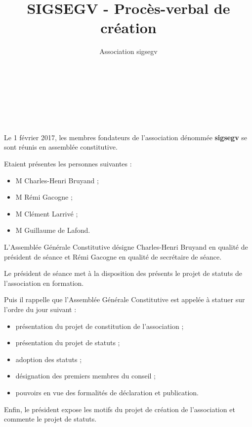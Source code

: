 \documentclass[a4paper,oneside,12pt]{article}
\begin{document}
\author{Association sigsegv}
\title{SIGSEGV - Procès-verbal de création}

{ \\
}
\vspace{5mm}
{\centering {\textbf {\Huge -}}\\
}
\vspace{5mm}
{\\
}

\section*{}

Le 1 février 2017, les membres fondateurs de l'association dénommée \textbf {sigsegv} se sont réunis en assemblée constitutive.

Etaient présentes les personnes suivantes :

\begin{itemize}
\item M Charles-Henri Bruyand ;
\item M Rémi Gacogne ;
\item M Clément Larrivé ;
\item M Guillaume de Lafond.
\end{itemize}

L’Assemblée Générale Constitutive désigne Charles-Henri Bruyand en qualité de président de séance et Rémi Gacogne en qualité de secrétaire de séance.

Le président de séance met à la disposition des présents le projet de statuts de l’association en formation.

Puis il rappelle que l’Assemblée Générale Constitutive est appelée à statuer sur l’ordre du jour suivant :

\begin{itemize}
\item présentation du projet de constitution de l’association ;
\item présentation du projet de statuts ;
\item adoption des statuts ;
\item désignation des premiers membres du conseil ;
\item pouvoirs en vue des formalités de déclaration et publication.
\end{itemize}

Enfin, le président expose les motifs du projet de création de l’association et commente le projet de statuts.
\end{document}
